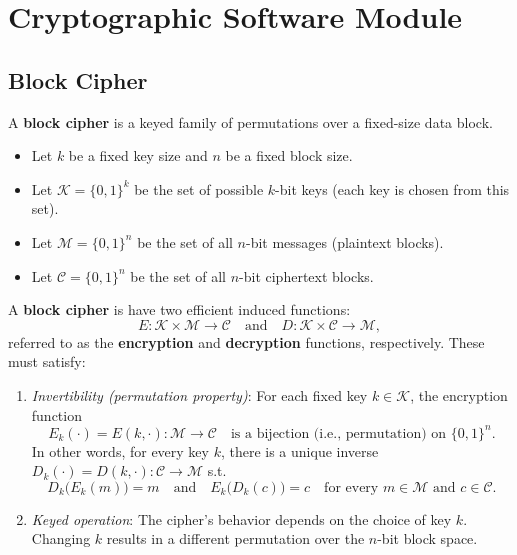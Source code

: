 \documentclass[11pt,a4paper]{report}
\theoremstyle{definitionstyle}
\begin{document}
\newpage
\chapter{Cryptographic Software Module}

\section{Block Cipher}
A \textbf{block cipher} is a keyed family of permutations over a fixed-size data block. \begin{itemize}
	\item Let \(k\) be a fixed key size and \(n\) be a fixed block size.
	\item Let \(\mathcal{K} = \{0,1\}^k\) be the set of possible $k$-bit keys (each key is chosen from this set).
	\item Let \(\mathcal{M} = \{0,1\}^n\) be the set of all \(n\)-bit messages (plaintext blocks).
	\item Let \(\mathcal{C} = \{0,1\}^n\) be the set of all \(n\)-bit ciphertext blocks.
\end{itemize}
A \textbf{block cipher} is have two efficient induced functions: \[
E : \mathcal{K} \times \mathcal{M} \to \mathcal{C} 
\quad\text{and}\quad
D : \mathcal{K} \times \mathcal{C} \to \mathcal{M},
\] referred to as the \textbf{encryption} and \textbf{decryption} functions, respectively. These must satisfy:
\begin{enumerate}
	\item \emph{Invertibility (permutation property)}: For each fixed key \(k \in \mathcal{K}\), the encryption function \[
	E_k(\cdot) = E(k, \cdot): \mathcal{M} \to \mathcal{C}\quad\text{is a bijection (i.e., permutation) on $\{0,1\}^n$.}
	\] In other words, for every key \(k\), there is a unique inverse $D_k(\cdot) = D(k, \cdot): \mathcal{C} \to \mathcal{M}$
	s.t. \[
	D_k\bigl(E_k(m)\bigr) = m \quad \text{and} \quad E_k\bigl(D_k(c)\bigr) = c\quad\text{for every $m \in \mathcal{M}$ and $c \in \mathcal{C}$.}
	\]
	\item \emph{Keyed operation}: The cipher’s behavior depends on the choice of key \(k\). Changing \(k\) results in a different permutation over the \(n\)-bit block space.
\end{enumerate}
\end{document}
